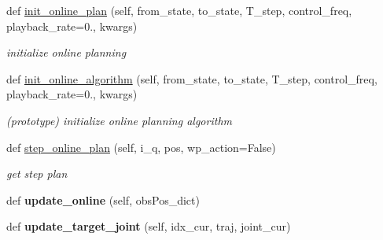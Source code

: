 \begin{DoxyCompactItemize}
def \hyperlink{classrnb-planning_1_1src_1_1pkg_1_1planning_1_1motion_1_1interface_1_1_motion_interface_ab3f280a7ce0edc02536790ab81736539}{init\+\_\+online\+\_\+plan} (self, from\+\_\+state, to\+\_\+state, T\+\_\+step, control\+\_\+freq, playback\+\_\+rate=0., kwargs)
\begin{DoxyCompactList}\small\item\em initialize online planning \end{DoxyCompactList}\item 
def \hyperlink{classrnb-planning_1_1src_1_1pkg_1_1planning_1_1motion_1_1interface_1_1_motion_interface_a46e6b1127c9db739624eb637823cd6f0}{init\+\_\+online\+\_\+algorithm} (self, from\+\_\+state, to\+\_\+state, T\+\_\+step, control\+\_\+freq, playback\+\_\+rate=0., kwargs)
\begin{DoxyCompactList}\small\item\em (prototype) initialize online planning algorithm \end{DoxyCompactList}\item 
def \hyperlink{classrnb-planning_1_1src_1_1pkg_1_1planning_1_1motion_1_1interface_1_1_motion_interface_a70671be391b7124ea7108e9602bd2e65}{step\+\_\+online\+\_\+plan} (self, i\+\_\+q, pos, wp\+\_\+action=False)
\begin{DoxyCompactList}\small\item\em get step plan \end{DoxyCompactList}\item 
\mbox{\label{classrnb-planning_1_1src_1_1pkg_1_1planning_1_1motion_1_1interface_1_1_motion_interface_a1807a123493e695653d12c3fc42cbb4b}} 
def {\bfseries update\+\_\+online} (self, obs\+Pos\+\_\+dict)
\item 
\mbox{\label{classrnb-planning_1_1src_1_1pkg_1_1planning_1_1motion_1_1interface_1_1_motion_interface_a58388087c5dc50240930c327e9c9f177}} 
def {\bfseries update\+\_\+target\+\_\+joint} (self, idx\+\_\+cur, traj, joint\+\_\+cur)
\end{DoxyCompactItemize}
